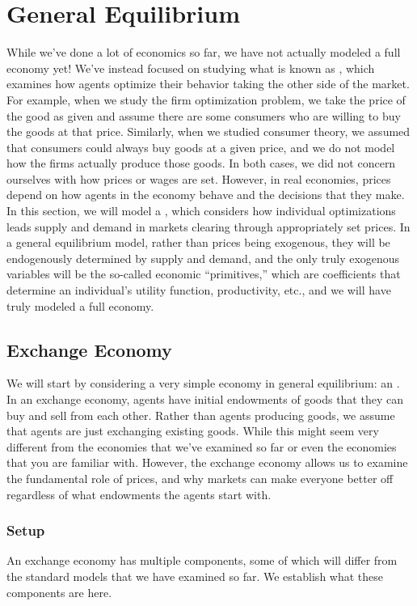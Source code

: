 \chapter{General Equilibrium} \label{ch:general_equilibrium}
While we've done a lot of economics so far, we have not actually modeled a full economy yet! We've instead focused on studying what is known as , which examines how agents optimize their behavior taking the other side of the market. For example, when we study the firm optimization problem, we take the price of the good as given and assume there are some consumers who are willing to buy the goods at that price. Similarly, when we studied consumer theory, we assumed that consumers could always buy goods at a given price, and we do not model how the firms actually produce those goods. In both cases, we did not concern ourselves with how prices or wages are set. However, in real economies, prices depend on how agents in the economy behave and the decisions that they make. In this section, we will model a , which considers how individual optimizations leads supply and demand in markets clearing through appropriately set prices. In a general equilibrium model, rather than prices being exogenous, they will be endogenously determined by supply and demand, and the only truly exogenous variables will be the so-called economic ``primitives,'' which are coefficients that determine an individual's utility function, productivity, etc., and we will have truly modeled a full economy. 

\section{Exchange Economy}
We will start by considering a very simple economy in general equilibrium: an . In an exchange economy, agents have initial endowments of goods that they can buy and sell from each other. Rather than agents producing goods, we assume that agents are just exchanging existing goods. While this might seem very different from the economies that we've examined so far or even the economies that you are familiar with. However, the exchange economy allows us to examine the fundamental role of prices, and why markets can make everyone better off regardless of what endowments the agents start with.

\subsection*{Setup}
An exchange economy has multiple components, some of which will differ from the standard models that we have examined so far. We establish what these components are here.

